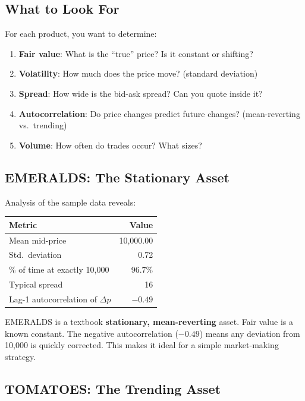 \documentclass[11pt, letterpaper]{article}
\begin{document}
\subsection{What to Look For}

For each product, you want to determine:

\begin{enumerate}
    \item \textbf{Fair value}: What is the ``true'' price? Is it constant or shifting?
    \item \textbf{Volatility}: How much does the price move? (standard deviation)
    \item \textbf{Spread}: How wide is the bid-ask spread? Can you quote inside it?
    \item \textbf{Autocorrelation}: Do price changes predict future changes? (mean-reverting vs.\ trending)
    \item \textbf{Volume}: How often do trades occur? What sizes?
\end{enumerate}

\subsection{EMERALDS: The Stationary Asset}

Analysis of the sample data reveals:

\begin{center}
\begin{tabular}{lr}
\toprule
\textbf{Metric} & \textbf{Value} \\
\midrule
Mean mid-price & 10{,}000.00 \\
Std.\ deviation & 0.72 \\
\% of time at exactly 10{,}000 & 96.7\% \\
Typical spread & 16 \\
Lag-1 autocorrelation of $\Delta p$ & $-0.49$ \\
\bottomrule
\end{tabular}
\end{center}

\begin{keyinsight}
EMERALDS is a textbook \textbf{stationary, mean-reverting} asset. Fair value is a known constant. The negative autocorrelation ($-0.49$) means any deviation from 10{,}000 is quickly corrected. This makes it ideal for a simple market-making strategy.
\end{keyinsight}

\subsection{TOMATOES: The Trending Asset}
\end{document}
